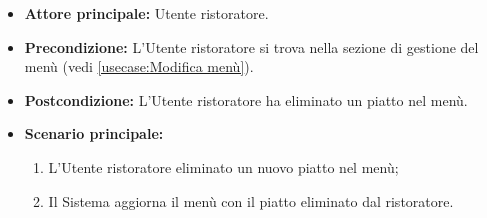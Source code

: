 \label{usecase:Eliminazione piatto}
\begin{itemize}

	\item \textbf{Attore principale:} Utente ristoratore.

	\item \textbf{Precondizione:} L'Utente ristoratore si trova nella sezione di gestione del menù (vedi \autoref{usecase:Modifica menù}).

	\item \textbf{Postcondizione:} L'Utente ristoratore ha eliminato un piatto nel menù.

	\item \textbf{Scenario principale:}
	\begin{enumerate}
		\item L'Utente ristoratore eliminato un nuovo piatto nel menù;
		\item Il Sistema aggiorna il menù con il piatto eliminato dal ristoratore.
	\end{enumerate}

\end{itemize}
